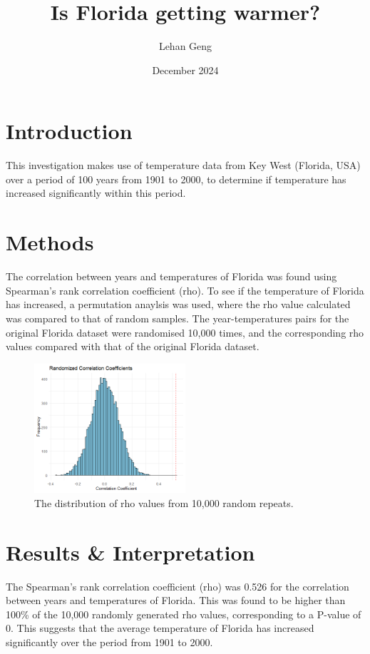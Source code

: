 \documentclass{article}
\title{\huge Is Florida getting warmer?}
\author{Lehan Geng}
\date{December 2024}
\begin{document}
 
\maketitle
 
\section{Introduction}
 
This investigation makes use of temperature data from Key West (Florida, USA) over a period of 100 years from 1901 to 2000, to determine if temperature has increased significantly within this period.
 
\section{Methods}
 
The correlation between years and temperatures of Florida was found using Spearman's rank correlation coefficient (rho). To see if the temperature of Florida has increased, a permutation anaylsis was used, where the rho value calculated was compared to that of random samples. The year-temperatures pairs for the original Florida dataset were randomised 10,000 times, and the corresponding rho values compared with that of the original Florida dataset.
 
\begin{figure}[h]
    \centering{}
    \includegraphics[width=0.5\textwidth]{Florida_Histogram.png}
    \caption{The distribution of rho values from 10,000 random repeats.}
    \label{fig:Histogram}
\end{figure}
 
\section{Results \& Interpretation}
 
The Spearman's rank correlation coefficient (rho) was 0.526 for the correlation between years and temperatures of Florida. This was found to be higher than 100\% of the 10,000 randomly generated rho values, corresponding to a P-value of 0. This suggests that the average temperature of Florida has increased significantly over the period from 1901 to 2000.
 
\end{document}
